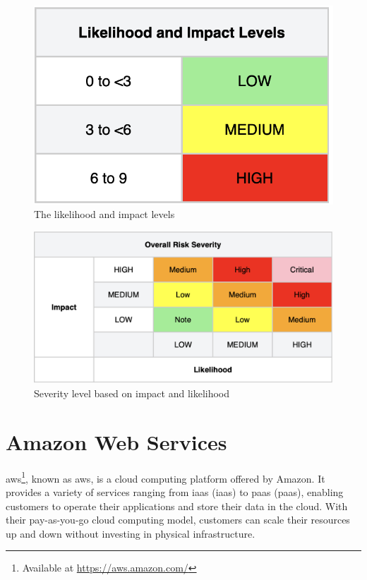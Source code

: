 \vspace{2mm}
\begin{figure}[H]
    \centering
    \includegraphics[scale=0.5]{Images/OWASP-likelihood.png}
    \caption{The likelihood and impact levels}
    \label{fig: Impact levels}
\end{figure}

\vspace{2mm}
\begin{figure}[H]
    \centering
    \includegraphics[scale=0.4]{Images/OWASP-severity.png}
    \caption{Severity level based on impact and likelihood}
    \label{fig: OWASP Severity Scale}
\end{figure}

\section{Amazon Web Services}
\acrlong{aws}\footnote{Available at \url{https://aws.amazon.com/}}, known as \acrshort{aws}, is a cloud computing platform offered by Amazon. It provides a variety of services ranging from \acrlong{iaas} (\acrshort{iaas}) to \acrlong{paas} (\acrshort{paas}), enabling customers to operate their applications and store their data in the cloud. With their pay-as-you-go cloud computing model, customers can scale their resources up and down without investing in physical infrastructure.\cite{aws}  

